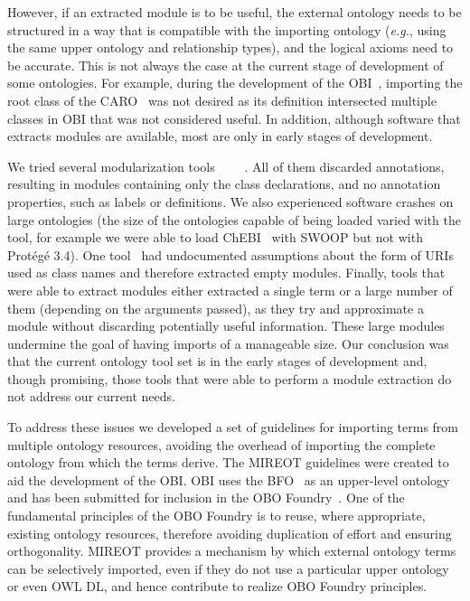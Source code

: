 \documentclass{ao2e}%
\begin{document}
However, if an extracted module is to be useful, the external ontology needs to be structured in a way that is compatible with the importing ontology (\emph{e.g.}, using the same upper ontology and relationship types), and the logical axioms need to be accurate. 
This is not always the case at the current stage of development of some ontologies.
For example, during the development of the \ac{OBI}~\cite{OBI}, importing the root class of the \ac{CARO}~\cite{CARO} was not desired as its definition intersected multiple classes in \ac{OBI} that was not considered useful. %
In addition, although software that extracts modules are available, most are only in early stages of development.

We tried several modularization tools~\cite{Grau2}~\cite{Jimenez} ~\cite{Seidenberg}~\cite{Sirin}. 
All of them discarded annotations, resulting in modules containing only the class declarations, and no annotation properties, such as labels or definitions.
We also experienced software crashes on large ontologies (the size of the ontologies capable of being loaded varied with the tool, for example we were able to load ChEBI~\cite{ChEBI} with SWOOP but not with Prot\'eg\'e 3.4).
One tool~\cite{Seidenberg} %
had undocumented assumptions about the form of URIs used as class names and therefore extracted empty modules. 
Finally, tools %
that were able to extract modules either extracted a single term or a large number of them (depending on the arguments passed), as they try and approximate a module without discarding potentially useful information. These large modules undermine the goal of having imports of a manageable size.
Our conclusion was that the current ontology tool set is in the early stages of development and, though promising, those tools that were able to perform a module extraction do not address our current needs.

To address these issues we developed a set of guidelines for importing terms from multiple ontology resources, avoiding the overhead of importing the complete ontology from which the terms derive. 
The \ac{MIREOT} guidelines were created to aid the development of the \ac{OBI}.
\ac{OBI} uses the \ac{BFO}~\cite{BFO} as an upper-level ontology and has been submitted for inclusion in the \ac{OBO} Foundry~\cite{OBOFoundry}. 
One of the fundamental principles of the \ac{OBO} Foundry is to reuse, where appropriate, existing ontology resources, therefore avoiding duplication of effort and ensuring orthogonality.
\ac{MIREOT} provides a mechanism by which external ontology terms can be selectively imported, even if they do not use a particular upper ontology or even OWL DL, and hence contribute to realize OBO Foundry principles.
\end{document}
